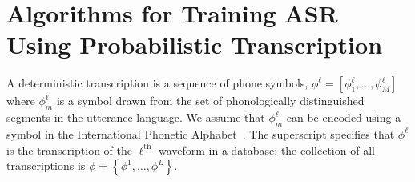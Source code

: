 \section{Algorithms for Training ASR Using Probabilistic Transcription}

A deterministic transcription is a sequence of phone symbols,
$\phi^\ell =[\phi_1^\ell,\ldots,\phi_M^\ell]$ where $\phi_m^\ell$ is a
symbol drawn from the set of phonologically distinguished segments in
the utterance language.  We assume that $\phi_m^\ell$ can be encoded
using a symbol in the International Phonetic Alphabet~\cite{ipa1993}.
The superscript specifies that $\phi^\ell$ is the transcription of the
$\ell^{\textrm{th}}$ waveform in a database; the collection of all
transcriptions is $\phi=\left\{\phi^1,\ldots,\phi^L\right\}$.

